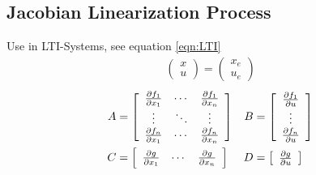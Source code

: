 \subsection*{Jacobian Linearization Process}
    Use in LTI-Systems, see equation \ref*{eqn:LTI}
    \begin{align*}
        \left(
            \begin{array}{c}
                x\\
                u
            \end{array}
        \right)
        =
        \left(
            \begin{array}{c}
                x_e\\
                u_e
            \end{array}
        \right)
    \end{align*}
    \begin{align*} %
        A &= 
        \left[\begin{array}{c c c}
            \frac{\partial f_1}{\partial x_1} & \cdots & \frac{\partial f_1}{\partial x_n}\\
            \vdots & \ddots & \vdots\\
            \frac{\partial f_n}{\partial x_1} & \cdots & \frac{\partial f_n}{\partial x_n}
        \end{array}\right]
        &B &= 
        \left[\begin{array}{c}
            \frac{\partial f_1}{\partial u}\\
            \vdots\\
            \frac{\partial f_n}{\partial u}
        \end{array}\right]
        \\
        C &= 
        \left[\begin{array}{c c c}
            \frac{\partial g}{\partial x_1} & \cdots & \frac{\partial g}{\partial x_n}
        \end{array}\right]
        &D &= 
        \left[\begin{array}{c}
            \frac{\partial g}{\partial u}
        \end{array}\right]
    \end{align*}